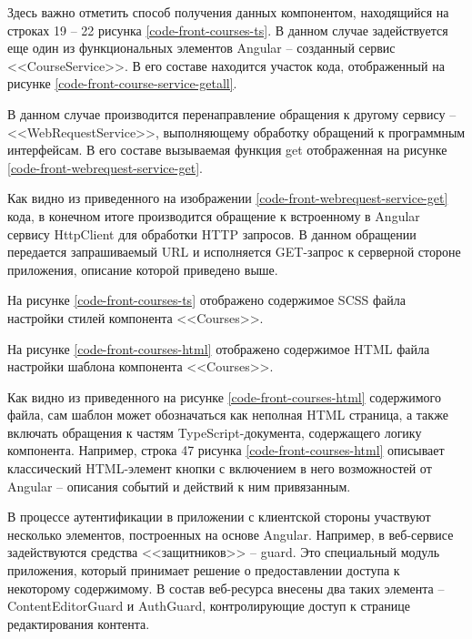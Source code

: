 Здесь важно отметить способ получения данных компонентом, находящийся на строках 19 -- 22 рисунка \ref{code-front-courses-ts}.
В данном случае задействуется еще один из функциональных элементов Angular -- созданный сервис <<CourseService>>.
В его составе находится участок кода, отображенный на рисунке \ref{code-front-course-service-getall}.


В данном случае производится перенаправление обращения к другому сервису -- <<WebRequestService>>, выполняющему обработку обращений к программным интерфейсам.
В его составе вызываемая функция get отображенная на рисунке \ref{code-front-webrequest-service-get}.


Как видно из приведенного на изображении \ref{code-front-webrequest-service-get} кода, в конечном итоге производится обращение к встроенному в Angular сервису HttpClient для обработки HTTP запросов.
В данном обращении передается запрашиваемый URL и исполняется GET-запрос к серверной стороне приложения, описание которой приведено выше.

На рисунке \ref{code-front-courses-ts} отображено содержимое SCSS файла настройки стилей компонента <<Courses>>.


На рисунке \ref{code-front-courses-html} отображено содержимое HTML файла настройки шаблона компонента <<Courses>>.


Как видно из приведенного на рисунке \ref{code-front-courses-html} содержимого файла, сам шаблон может обозначаться как неполная HTML страница, а также включать обращения к частям TypeScript-документа, содержащего логику компонента.
Например, строка 47 рисунка \ref{code-front-courses-html} описывает классический HTML-элемент кнопки с включением в него возможностей от Angular -- описания событий и действий к ним привязанным.

В процессе аутентификации в приложении с клиентской стороны участвуют несколько элементов, построенных на основе Angular.
Например, в веб-сервисе задействуются средства <<защитников>> -- guard.
Это специальный модуль приложения, который принимает решение о предоставлении доступа к некоторому содержимому.
В состав веб-ресурса внесены два таких элемента -- ContentEditorGuard и AuthGuard, контролирующие доступ к странице редактирования контента.

